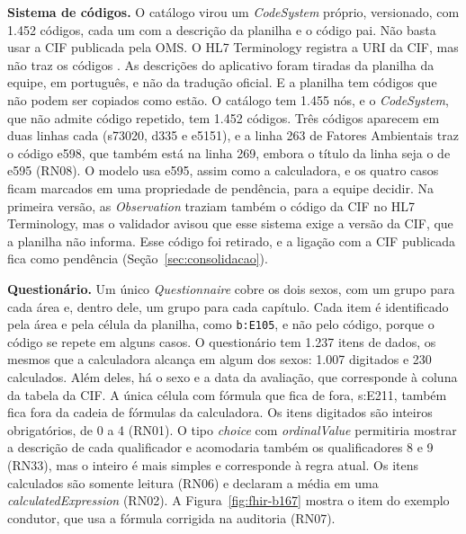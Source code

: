 \textbf{Sistema de códigos.} O catálogo virou um \textit{CodeSystem} próprio, versionado, com 1.452 códigos, cada um
com a descrição da planilha e o código pai. Não basta usar a CIF publicada pela OMS. O HL7 Terminology registra a URI
da CIF, mas não traz os códigos \cite{hl7tho2025icf}. As descrições do aplicativo foram tiradas da planilha da
equipe, em português, e não da tradução oficial. E a planilha tem códigos que não podem ser copiados como estão. O
catálogo tem 1.455 nós, e o \textit{CodeSystem}, que não admite código repetido, tem 1.452 códigos. Três códigos
aparecem em duas linhas cada (s73020, d335 e e5151), e a linha 263 de Fatores Ambientais traz o código e598, que
também está na linha 269, embora o título da linha seja o de e595 (RN08). O modelo usa e595, assim como a
calculadora, e os quatro casos ficam marcados em uma propriedade de pendência, para a equipe decidir. Na primeira
versão, as \textit{Observation} traziam também o código da CIF no HL7 Terminology, mas o validador avisou que esse
sistema exige a versão da CIF, que a planilha não informa. Esse código foi retirado, e a ligação com a CIF publicada
fica como pendência (Seção~\ref{sec:consolidacao}).

\textbf{Questionário.} Um único \textit{Questionnaire} cobre os dois sexos, com um grupo para cada área e, dentro
dele, um grupo para cada capítulo. Cada item é identificado pela área e pela célula da planilha, como
\texttt{b:E105}, e não pelo código, porque o código se repete em alguns casos. O questionário tem 1.237 itens de
dados, os mesmos que a calculadora alcança em algum dos sexos: 1.007 digitados e 230 calculados. Além deles, há o
sexo e a data da avaliação, que corresponde à coluna  da tabela da CIF. A única célula com
fórmula que fica de fora, s:E211, também fica fora da cadeia de fórmulas da calculadora. Os itens digitados são
inteiros obrigatórios, de 0 a 4 (RN01). O tipo \textit{choice} com \textit{ordinalValue} permitiria mostrar a
descrição de cada qualificador e acomodaria também os qualificadores 8 e 9 (RN33), mas o inteiro é mais simples e
corresponde à regra atual. Os itens calculados são somente leitura (RN06) e declaram a média em uma
\textit{calculatedExpression} (RN02). A Figura~\ref{fig:fhir-b167} mostra o item do exemplo condutor, que usa a
fórmula corrigida na auditoria (RN07).

